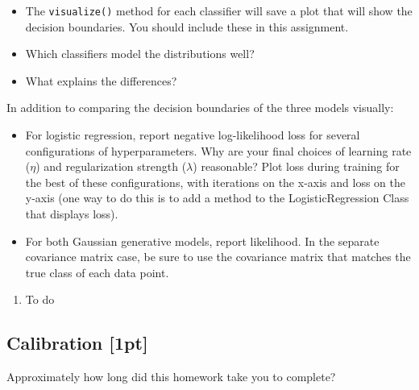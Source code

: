 \documentclass[submit]{harvardml}
\begin{document}
\begin{problem}
\begin{itemize}
\item The \texttt{visualize()} method for each classifier will save a plot that will show the decision boundaries. You should include these in this assignment.
\item Which classifiers model the distributions well?
\item What explains the differences?

\end{itemize}

In addition to comparing the decision boundaries of the three models visually:
\begin{itemize}

\item For logistic regression, report negative log-likelihood loss for several configurations of hyperparameters. Why are your final choices of learning rate ($\eta$) and regularization strength ($\lambda$) reasonable? Plot loss during training for the best of these configurations, with iterations on the x-axis and loss on the y-axis (one way to do this is to add a method to the LogisticRegression Class that displays loss).

\item For both Gaussian generative models, report likelihood. In the separate covariance matrix case, be sure to use the covariance matrix that matches the true class of each data point.

\end{itemize}

\end{problem}

\begin{solution}
\begin{sol}
\begin{enumerate}
\item To do
\end{enumerate}
\end{sol}
\end{solution}


\newpage
\subsection*{Calibration [1pt]}
Approximately how long did this homework take you to complete?
\end{document}
